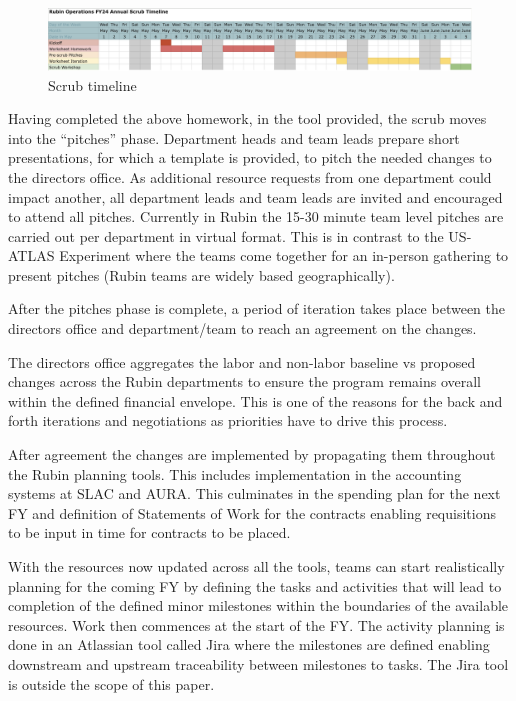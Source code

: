 \begin{figure}[hb!]
\begin{centering}
\includegraphics[width=1.0\textwidth]{Figure1Scrubtimeline}
	\caption{Scrub timeline
\label{fig:timeline}}
\end{centering}
\end{figure}
Having completed the above homework, in the tool provided, the scrub moves into the “pitches” phase. Department heads and team leads prepare short presentations, for which a template is provided, to pitch the needed changes to the directors office. As additional resource requests from one department could impact another, all department leads and team leads are invited and encouraged to attend all pitches. Currently in Rubin the 15-30 minute team level pitches are carried out per department in virtual format. This is in contrast to the US-ATLAS Experiment where the teams come together for an in-person gathering to present pitches (Rubin teams are widely based geographically).

After the pitches phase is complete, a period of iteration takes place between the directors office and department/team to reach an agreement on the changes.

The directors office aggregates the labor and non-labor baseline vs proposed changes across the Rubin departments to ensure the program remains overall within the defined financial envelope. This is one of the reasons for the back and forth iterations and negotiations as priorities have to drive this process.

After agreement the changes are implemented by propagating them throughout the Rubin planning tools. This includes implementation in the accounting systems at SLAC and AURA. This culminates in the spending plan for the next FY and definition of Statements of Work for the contracts enabling requisitions to be input in time for contracts to be placed.

With the resources now updated across all the tools, teams can start realistically planning for the coming FY by defining the tasks and activities that will lead to completion of the defined minor milestones within the boundaries of the available resources. Work then commences at the start of the FY. The activity planning is done in an Atlassian tool called Jira where the milestones are defined enabling downstream and upstream traceability between milestones to tasks. The Jira tool is outside the scope of this paper.

